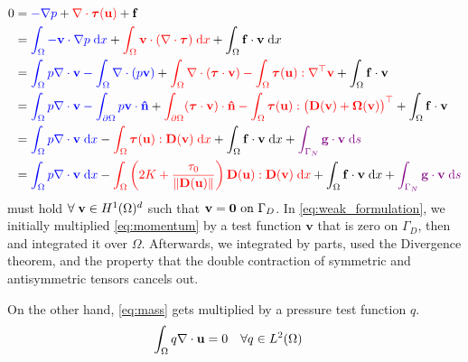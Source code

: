 \documentclass[11 pt]{report}
\begin{document}
\begin{equation}
    \begin{aligned}
        0 &= {\color{blue}-\nabla p} + {\color{red} \nabla \cdot \boldsymbol{\tau}(\mathbf{u})} + \mathbf{f}\\
        &= {\color{blue} \int_{\Omega} - \mathbf{v} \cdot \nabla p \;\dd x} + {\color{red} \int_{\Omega} \mathbf{v} \cdot (\nabla \cdot \boldsymbol{\tau}) \;\dd x} + \int_{\Omega} \mathbf{f} \cdot \mathbf{v}  \;\dd x\\
        &= {\color{blue} \int_{\Omega} p \nabla \cdot \mathbf{v} - \int_{\Omega} \nabla \cdot (p\mathbf{v})} + {\color{red} \int_{\Omega} \nabla \cdot (\boldsymbol{\tau} \cdot \mathbf{v}) - \int_{\Omega}  \boldsymbol{\tau} (\mathbf{u}) : \nabla^\top \mathbf{v}} + \int_{\Omega} \mathbf{f} \cdot \mathbf{v}\\
        &= {\color{blue} \int_{\Omega} p \nabla \cdot \mathbf{v} - \int_{\partial \Omega} p \mathbf{v} \cdot \mathbf{\hat n}} + {\color{red} \int_{\partial\Omega} (\boldsymbol{\tau} \cdot \mathbf{v}) \cdot \mathbf{\hat n} - \int_{\Omega}  \boldsymbol{\tau} (\mathbf{u}) : \big(\mathbf{D}(\mathbf{v}) + \mathbf{\Omega}(\mathbf{v})\big)^\top} + \int_{\Omega} \mathbf{f} \cdot \mathbf{v} \\
        &= {\color{blue} \int_{\Omega} p \nabla \cdot \mathbf{v} \;\dd x} - {\color{red} \int_{\Omega}  \boldsymbol{\tau} (\mathbf{u}) : \mathbf{D}(\mathbf{v}) \;\dd x} + \int_{\Omega} \mathbf{f} \cdot \mathbf{v} \;\dd x + {\color{violet}\int_{\Gamma_N} \mathbf{g} \cdot \mathbf{v} \; \dd s}\\
        &= {\color{blue} \int_{\Omega} p \nabla \cdot \mathbf{v} \;\dd x} - {\color{red} \int_{\Omega}  \left( 2K + \frac{\tau_0}{\|\mathbf{D}(\mathbf{u})\|} \right) \mathbf{D}(\mathbf{u}) : \mathbf{D}(\mathbf{v}) \;\dd x} + \int_{\Omega} \mathbf{f} \cdot \mathbf{v} \;\dd x + {\color{violet}\int_{\Gamma_N} \mathbf{g} \cdot \mathbf{v} \; \dd s}
    \end{aligned}\label{eq:weak_formulation}
\end{equation}
 must hold $\forall \; \mathbf{v} \in H^1(\Omega)^d$ such that $\mathbf{v} = \mathbf{0} \text{ on } \Gamma_D$. In \cref{eq:weak_formulation}, we initially multiplied \cref{eq:momentum} by a test function $\mathbf{v}$ that is zero on $\Gamma_D$, then and integrated it over $\Omega$. Afterwards, we integrated by parts, used the Divergence theorem, and the property that the double contraction of symmetric and antisymmetric tensors cancels out.

On the other hand, \autoref{eq:mass} gets multiplied by a pressure test function $q$.
\begin{equation}
    \begin{aligned}
        \int_{\Omega} q \nabla \cdot \mathbf{u} &= 0  && \forall q \in L^2(\Omega)
    \end{aligned}
    \label{eq:weak_formulation_p}
\end{equation}
\end{document}
